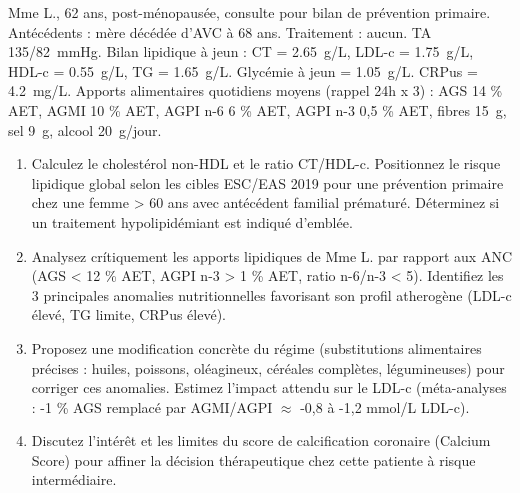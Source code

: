\documentclass[11pt]{article}
\begin{document}
\begin{exercice}
Mme L., 62 ans, post-ménopausée, consulte pour bilan de prévention primaire. Antécédents : mère décédée d'AVC à 68 ans. Traitement : aucun. TA \SI{135/82}{mmHg}. Bilan lipidique à jeun : CT = \SI{2,65}{g/L}, LDL-c = \SI{1,75}{g/L}, HDL-c = \SI{0,55}{g/L}, TG = \SI{1,65}{g/L}. Glycémie à jeun = \SI{1,05}{g/L}. CRPus = \SI{4,2}{mg/L}. Apports alimentaires quotidiens moyens (rappel 24h x 3) : AGS 14 \% AET, AGMI 10 \% AET, AGPI n-6 6 \% AET, AGPI n-3 0,5 \% AET, fibres \SI{15}{g}, sel \SI{9}{g}, alcool \SI{20}{g}/jour.
\begin{enumerate}
    \item Calculez le cholestérol non-HDL et le ratio CT/HDL-c. Positionnez le risque lipidique global selon les cibles ESC/EAS 2019 pour une prévention primaire chez une femme > 60 ans avec antécédent familial prématuré. Déterminez si un traitement hypolipidémiant est indiqué d'emblée.
    \item Analysez crítiquement les apports lipidiques de Mme L. par rapport aux ANC (AGS < 12 \% AET, AGPI n-3 > 1 \% AET, ratio n-6/n-3 < 5). Identifiez les 3 principales anomalies nutritionnelles favorisant son profil atherogène (LDL-c élevé, TG limite, CRPus élevé).
    \item Proposez une modification concrète du régime (substitutions alimentaires précises : huiles, poissons, oléagineux, céréales complètes, légumineuses) pour corriger ces anomalies. Estimez l'impact attendu sur le LDL-c (méta-analyses : -1 \% AGS remplacé par AGMI/AGPI $\approx$ -0,8 à -1,2 mmol/L LDL-c).
    \item Discutez l'intérêt et les limites du score de calcification coronaire (Calcium Score) pour affiner la décision thérapeutique chez cette patiente à risque intermédiaire.
\end{enumerate}
\end{exercice}
\end{document}
